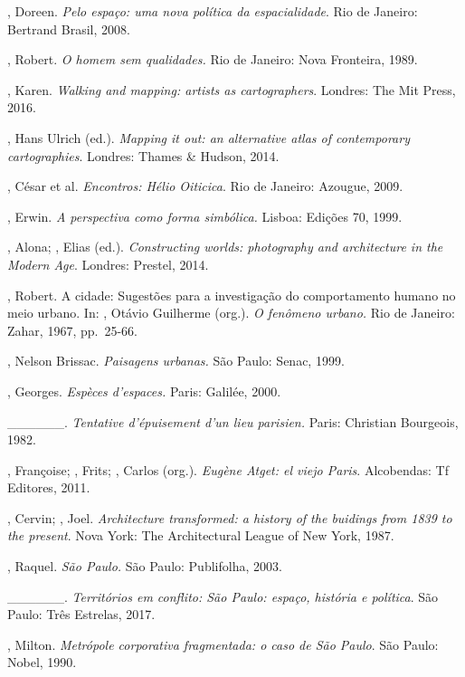 \begin{Parskip}
, Doreen. \emph{Pelo espaço: uma nova política da
espacialidade}. Rio de Janeiro: Bertrand Brasil, 2008.

, Robert. \emph{O homem sem qualidades.} Rio de Janeiro: Nova
Fronteira, 1989.

, Karen. \emph{Walking and mapping: artists as cartographers}.
Londres: The Mit Press, 2016. %

, Hans Ulrich (ed.). \emph{Mapping it out: an alternative atlas
of contemporary cartographies}. Londres: Thames \& Hudson, 2014.

, César et al. \emph{Encontros: Hélio Oiticica}. Rio de
Janeiro: Azougue, 2009.

, Erwin. \emph{A perspectiva como forma simbólica.} Lisboa:
Edições 70, 1999.

, Alona; , Elias (ed.). \emph{Constructing worlds:
photography and architecture in the Modern Age}. Londres: Prestel, 2014.

, Robert. A cidade: Sugestões para a investigação do comportamento
humano no meio urbano. In: , Otávio Guilherme (org.). \emph{O
fenômeno urbano.} Rio de Janeiro: Zahar, 1967, pp.~25-66.

, Nelson Brissac. \emph{Paisagens urbanas.} São Paulo: Senac, 1999.

, Georges. \emph{Espèces d'espaces.} Paris: Galilée, 2000.

\_\_\_\_\_\_. \emph{Tentative d'épuisement d'un lieu parisien.}
Paris: Christian Bourgeois, 1982.

, Françoise; , Frits; , Carlos (org.).
\emph{Eugène Atget: el viejo Paris}. Alcobendas: Tf Editores, 2011.

, Cervin; , Joel. \emph{Architecture transformed: a
history of the buidings from 1839 to the present}. Nova York: The
Architectural League of New York, 1987.

, Raquel. \emph{São Paulo.} São Paulo: Publifolha, 2003.

\_\_\_\_\_\_. \emph{Territórios em conflito: São Paulo: espaço,
história e política}. São Paulo: Três Estrelas, 2017.

, Milton. \emph{Metrópole corporativa fragmentada: o caso de
São Paulo}. São Paulo: Nobel, 1990.


\end{Parskip}
